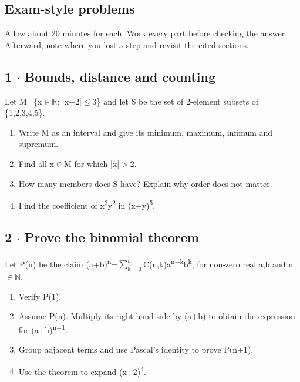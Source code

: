 \documentclass[11pt]{article}
\begin{document}
\begin{keepsection}
\section{Exam-style problems}

Allow about 20 minutes for each. Work every part before checking the answer. Afterward, note where you lost a step and revisit the cited sections.

\begin{keepsection}
\subsection{1 \ensuremath{\cdot} Bounds, distance and counting}

Let M=\{x\ensuremath{\in}\ensuremath{\mathbb{R}}: |x\ensuremath{-}2|\ensuremath{\leq}3\} and let S be the set of 2-element subsets of \{1,2,3,4,5\}.

\begin{enumerate}
\item Write M as an interval and give its minimum, maximum, infimum and supremum.
\item Find all x\ensuremath{\in}M for which |x|\ensuremath{>}2.
\item How many members does S have? Explain why order does not matter.
\item Find the coefficient of x\textsuperscript{3}y\textsuperscript{2} in (x+y)\textsuperscript{5}.
\end{enumerate}

\end{keepsection}

\begin{keepsection}
\subsection{2 \ensuremath{\cdot} Prove the binomial theorem}

Let P(n) be the claim (a+b)\textsuperscript{n}=$\sum_{\mathrm{k}=0}^{\mathrm{n}} $C(n,k)a\textsuperscript{n\ensuremath{-}k}b\textsuperscript{k}, for non-zero real a,b and n\ensuremath{\in}\ensuremath{\mathbb{N}}.

\begin{enumerate}
\item Verify P(1).
\item Assume P(n). Multiply its right-hand side by (a+b) to obtain the expression for (a+b)\textsuperscript{n+1}.
\item Group adjacent terms and use Pascal’s identity to prove P(n+1).
\item Use the theorem to expand (x+2)\textsuperscript{4}.
\end{enumerate}


\end{keepsection}
\end{keepsection}
\end{document}
